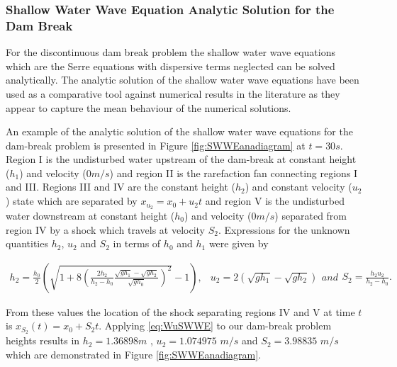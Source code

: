 \documentclass[times]{elsarticle}
\begin{document}
\subsubsection{Shallow Water Wave Equation Analytic Solution for the Dam Break}
For the discontinuous dam break problem the shallow water wave equations which are the Serre equations with dispersive terms neglected can be solved analytically. The analytic solution of the shallow water wave equations have been used as a comparative tool against numerical results in the literature \cite{Hank-etal-2010-2034,Mitsotakis-etal-2014} as they appear to capture the mean behaviour of the numerical solutions. 

An example of the analytic solution of the shallow water wave equations for the dam-break problem is presented in Figure \ref{fig:SWWEanadiagram} at $t=30s$. Region I is the undisturbed water upstream of the dam-break at constant height ($h_1$) and velocity ($0m/s$) and region II is the rarefaction fan connecting regions I and III. Regions III and IV are the constant height ($h_2$) and constant velocity ($u_2$) state which are separated by $x_{u_2} = x_0 + u_2t$ and region V is the undisturbed water downstream at constant height ($h_0$) and velocity ($0m/s$) separated from region IV by a shock which travels at velocity $S_2$. Expressions for the unknown quantities $h_2$, $u_2$ and $S_2$ in terms of $h_0$ and $h_1$ were given by \citet{Wu-etal-1999-1210}
\begin{linenomath*}
\begin{subequations}
\begin{gather}
h_2 = \frac{h_0}{2} \left(\sqrt{1 + 8 \left(\frac{2h_2}{h_2 - h_0}\frac{\sqrt{gh_1} - \sqrt{gh_2}}{\sqrt{gh_0}}\right)^2} - 1\right),
\end{gather}
	\begin{gather}
	u_2 = 2\left(\sqrt{gh_1} - \sqrt{gh_2}\right)
	\end{gather}
and
	\begin{gather}
	S_2 = \frac{h_2 u_2}{h_2 - h_0}.
	\end{gather}
\label{eq:WuSWWE}	
\end{subequations}
\end{linenomath*}
From these values the location of the shock separating regions IV and V at time $t$ is $x_{S_2}(t) = x_0 + S_2t$. Applying \eqref{eq:WuSWWE} to our dam-break problem heights results in $h_2 = 1.36898m$ , $u_2 = 1.074975$ $m/s$ and $S_2 = 3.98835$ $m/s$ which are demonstrated in Figure \ref{fig:SWWEanadiagram}.
\end{document}
